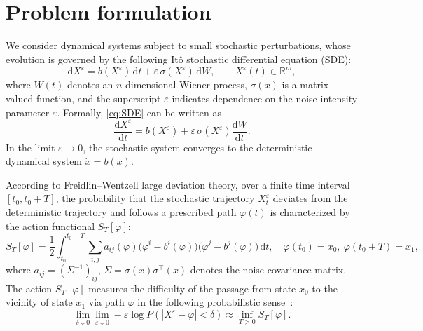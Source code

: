 \documentclass[a4paper,fleqn, 12pt]{cas-sc}
\numberwithin{table}{section}
\begin{document}
\section{Problem formulation}
\label{Problem Formulation}

We consider dynamical systems subject to small stochastic perturbations, whose evolution is governed by the following It\^o stochastic differential equation (SDE):
\begin{equation}
	\mathrm{d} X^{\varepsilon}
	=
	b(X^{\varepsilon})\,\mathrm{d} t
	+
	\varepsilon\, \sigma(X^{\varepsilon})\,\mathrm{d} W,
	\qquad
	X^{\varepsilon}(t) \in \mathbb{R}^m,
	\label{eq:SDE}
\end{equation}
where $W(t)$ denotes an $n$-dimensional Wiener process, $\sigma(x)$ is a matrix-valued function, and the superscript $\varepsilon$ indicates dependence on the noise intensity parameter $\varepsilon$. Formally, \eqref{eq:SDE} can be written as
\[
\frac{\mathrm{d} X^{\varepsilon}}{\mathrm{d} t}
=
b(X^{\varepsilon})
+
\varepsilon\, \sigma(X^{\varepsilon})
\frac{\mathrm{d} W}{\mathrm{d} t}.
\]
In the limit $\varepsilon \to 0$, the stochastic system converges to the deterministic dynamical system $\dot{x} = b(x)$.

According to Freidlin--Wentzell large deviation theory, over a finite time interval $[t_0, t_0+T]$, the probability that the stochastic trajectory $X_t^{\varepsilon}$ deviates from the deterministic trajectory and follows a prescribed path $\varphi(t)$ is characterized by the action functional $S_T[\varphi]$:
\begin{equation}\label{eq:ActionSt}
    S_T[\varphi]
=
\frac{1}{2}
\int_{t_0}^{t_0+T}\!\!
\sum_{i,j}
a_{ij}(\varphi)
\bigl(\dot{\varphi}^i - b^i(\varphi)\bigr)
\bigl(\dot{\varphi}^j - b^j(\varphi)\bigr)
\,\mathrm{d}t,
\quad
\varphi(t_0)=x_0,\ \varphi(t_0+T)=x_1,
\end{equation}
where $a_{ij} = (\Sigma^{-1})_{ij}$, $\Sigma = \sigma(x)\sigma^\top(x)$ denotes the noise covariance matrix. 
The action $S_T[\varphi]$ measures the
difficulty of the passage from state $x_0$ to the vicinity of state $x_1$ via path $\varphi$ in
the following probabilistic sense~{\cite{freidlin_random_2012}}:
\[ \lim_{\delta \downarrow 0} \lim_{\varepsilon \downarrow 0} - \varepsilon
{\log P} (|X^{\varepsilon} - \varphi | < \delta) \approx
\inf_{T > 0} S_T [\varphi] . \]
\end{document}
